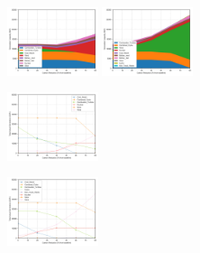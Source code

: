 \documentclass[xcolor=dvipsnames]{beamer}
\begin{document}
\begin{frame}
\begin{itemize}
  \includegraphics[width=0.2\textwidth]{includes/leakage_shutdowns_agg_capacity_cntlreg.png}
  \includegraphics[width=0.2\textwidth]{includes/no_leakage_shutdowns_agg_capacity_cntlreg.png}

  \includegraphics[width=0.2\textwidth]{includes/leakage_shutdowns_agg_generation_cntlreg.png}

  \includegraphics[width=0.2\textwidth]{includes/no_leakage_shutdowns_agg_generation_cntlreg.png}
\end{itemize}
\end{frame}
\end{document}
